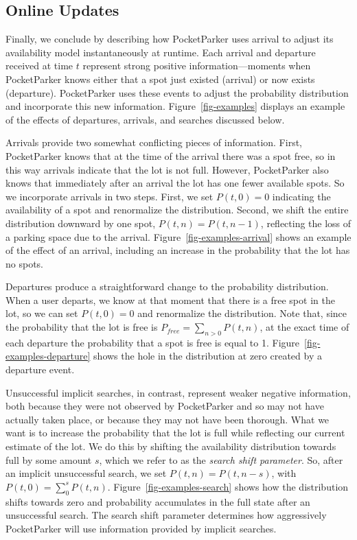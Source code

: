 \subsection{Online Updates}
\label{subsec-online}

Finally, we conclude by describing how PocketParker uses arrival to adjust
its availability model instantaneously at runtime. Each arrival and departure
received at time $t$ represent strong positive information---moments when
PocketParker knows either that a spot just existed (arrival) or now exists
(departure). PocketParker uses these events to adjust the probability
distribution and incorporate this new information. Figure~\ref{fig-examples}
displays an example of the effects of departures, arrivals, and searches
discussed below.

Arrivals provide two somewhat conflicting pieces of information. First,
PocketParker knows that at the time of the arrival there was a spot free, so
in this way arrivals indicate that the lot is not full. However, PocketParker
also knows that immediately after an arrival the lot has one fewer available
spots. So we incorporate arrivals in two steps. First, we set $P(t, 0) = 0$
indicating the availability of a spot and renormalize the distribution.
Second, we shift the entire distribution downward by one spot, $P(t, n) =
P(t, n - 1)$, reflecting the loss of a parking space due to the arrival.
Figure~\ref{fig-examples-arrival} shows an example of the effect of an
arrival, including an increase in the probability that the lot has no spots.

Departures produce a straightforward change to the probability distribution.
When a user departs, we know at that moment that there is a free spot in the
lot, so we can set $P(t, 0) = 0$ and renormalize the distribution. Note that,
since the probability that the lot is free is $P_{free} = \sum_{n > 0} P(t,
n)$, at the exact time of each departure the probability that a spot is free
is equal to 1. Figure~\ref{fig-examples-departure} shows the hole in the
distribution at zero created by a departure event.

Unsuccessful implicit searches, in contrast, represent weaker negative
information, both because they were not observed by PocketParker and so may
not have actually taken place, or because they may not have been thorough.
What we want is to increase the probability that the lot is full while
reflecting our current estimate of the lot. We do this by shifting the
availability distribution towards full by some amount $s$, which we refer to
as the \textit{search shift parameter}. So, after an implicit unsuccessful
search, we set $P(t, n) = P(t, n - s)$, with $P(t, 0) = \sum_0^s P(t, n)$.
Figure~\ref{fig-examples-search} shows how the distribution shifts towards
zero and probability accumulates in the full state after an unsuccessful
search. The search shift parameter determines how aggressively PocketParker
will use information provided by implicit searches.

